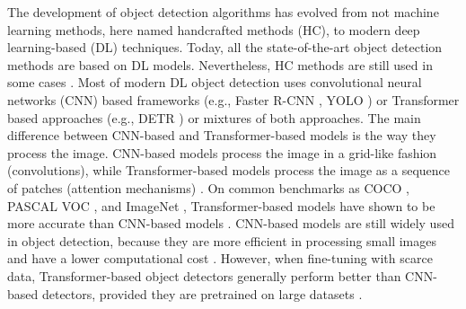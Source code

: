 \documentclass[12pt,a4paper,oneside]{report}
\begin{document}
The development of object detection algorithms has evolved from not machine learning methods, 
here named handcrafted methods (HC), to modern deep learning-based (DL) techniques.
Today, all the state-of-the-art object detection methods are based on DL models. 
Nevertheless, HC methods are still used in some cases 
\cite{davidPlantDetectionCounting2021,garcia-martinezDigitalCountCorn2020}. 
Most of modern DL object detection uses convolutional neural networks (CNN) \cite{lecunDeepLearning2015} based 
frameworks (e.g., Faster R-CNN \cite{FasterRCNNRealTime}, YOLO \cite{YouOnlyLook}) 
or Transformer \cite{vaswaniAttentionAllYou2017} based approaches (e.g., DETR \cite{carionEndtoEndObjectDetection2020})
or mixtures of both approaches.
The main difference between CNN-based and Transformer-based models is the way they
process the image. CNN-based models process the image in a grid-like fashion (convolutions),
while Transformer-based models process the image as a sequence of patches (attention mechanisms) \cite{dosovitskiyImageWorth16x162021}.
On common benchmarks as COCO \cite{linMicrosoftCOCOCommon2015}, PASCAL VOC \cite{jingSelfsupervisedVisualFeature2019}, 
and ImageNet \cite{14090575ImageNetLarge}, Transformer-based models have shown 
to be more accurate than CNN-based models \cite{zongDETRsCollaborativeHybrid2023} .
CNN-based models are still widely used in object detection, because they are
more efficient in processing small images and have a lower computational cost \cite{khanSurveyVisionTransformers2023}.
However, when fine-tuning with scarce data, Transformer-based object detectors generally 
perform better than CNN-based detectors, provided they are pretrained on large datasets \cite{rekavandiTransformersSmallObject2023,liTransformerObjectDetection2023,amjoudObjectDetectionUsing2023}.
\end{document}
